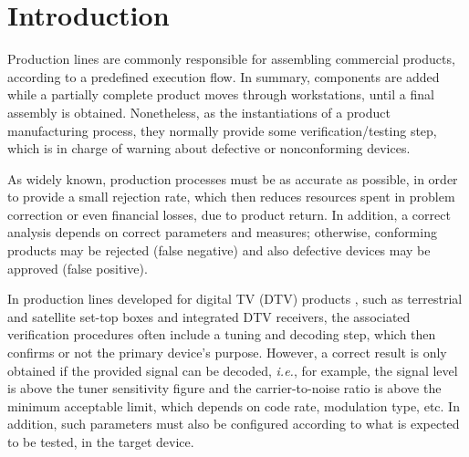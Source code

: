 \documentclass[conference]{IEEEtran}
\begin{document}




%
\IEEEpeerreviewmaketitle



\section{Introduction}
\label{intro}

Production lines are commonly responsible for assembling commercial products, according to a predefined execution flow. In summary, components are added while a partially complete product moves through workstations, until a final assembly is obtained. Nonetheless, as the instantiations of a product manufacturing process, they normally provide some verification/testing step, which is in charge of warning about defective or nonconforming devices.

As widely known, production processes must be as accurate as possible, in order to provide a small rejection rate, which then reduces resources spent in problem correction or even financial losses, due to product return. In addition, a correct analysis depends on correct parameters and measures; otherwise, conforming products may be rejected (false negative) and also defective devices may be approved (false positive).

In production lines developed for digital TV (DTV) products \cite{keith}, such as terrestrial and satellite set-top boxes and integrated DTV receivers, the associated verification procedures often include a tuning and decoding step, which then confirms or not the primary device's purpose. However, a correct result is only obtained if the provided signal can be decoded, {\it i.e.}, for example, the signal level is above the tuner sensitivity figure and the carrier-to-noise ratio is above the minimum acceptable limit, which depends on code rate, modulation type, etc. In addition, such parameters must also be configured according to what is expected to be tested, in the target device.%
\end{document}
